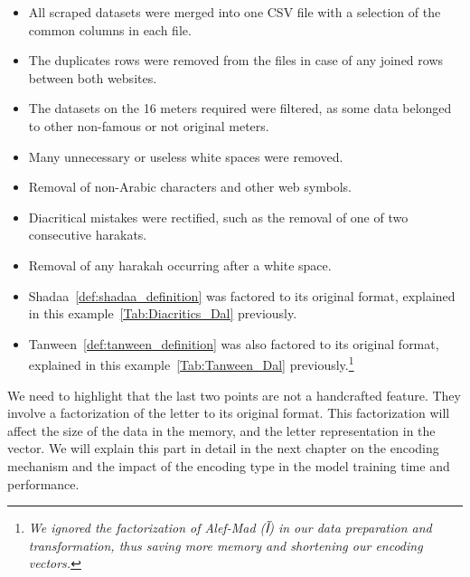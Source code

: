 \begin{enumerate}
 \begin{itemize}
  \item All scraped datasets were merged into one CSV file with a selection of the common columns in each file.
  \item The duplicates rows were removed from the files in case of any joined rows between both websites.
  \item The datasets on the 16 meters required were filtered, as some data belonged to other non-famous or not original meters.
  \item Many unnecessary or useless white spaces were removed.
  \item Removal of non-Arabic characters and other web symbols.
  \item Diacritical mistakes were rectified, such as the removal of one of two consecutive harakats. 
  \item Removal of any harakah occurring after a white space. 
  \item Shadaa~\ref{def:shadaa_definition} was factored to its original format, explained in this example~\ref{Tab:Diacritics_Dal} previously.
  \item Tanween~\ref{def:tanween_definition} was also factored to its original format, explained in this example~\ref{Tab:Tanween_Dal} previously.\footnote{\textit{We ignored the factorization of Alef-Mad \textarabic{(آ)} in our data preparation and transformation, thus saving more memory and shortening our encoding vectors.}}
 \end{itemize}

 We need to highlight that the last two points are not a handcrafted feature. They involve a factorization of the letter to its original format. This factorization will affect the size of the data in the memory, and the letter representation in the vector. We will explain this part in detail in the next chapter on the encoding mechanism and the impact of the encoding type in the model training time and performance.


\end{enumerate}
